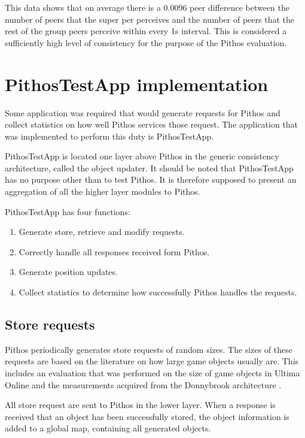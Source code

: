 This data shows that on average there is a 0.0096 peer difference between the number of peers that the super per perceives and the number of peers that the rest of the group peers perceive within every 1s interval. This is considered a sufficiently high level of consistency for the purpose of the Pithos evaluation.

\section{PithosTestApp implementation}
\label{pithostestapp}

Some application was required that would generate requests for Pithos and collect statistics on how well Pithos services those request. The application that was implemented to perform this duty is PithosTestApp.

PithosTestApp is located one layer above Pithos in the generic consistency architecture, called the object updater. It should be noted that PithosTestApp has no purpose other than to test Pithos. It is therefore supposed to present an aggregation of all the higher layer modules to Pithos.

PithosTestApp has four functions:
\begin{enumerate}
\item Generate store, retrieve and modify requests.
\item Correctly handle all responses received form Pithos.
\item Generate position updates.
\item Collect statistics to determine how successfully Pithos handles the requests.
\end{enumerate}

\subsection{Store requests}

Pithos periodically generates store requests of random sizes. The sizes of these requests are based on the literature on how large game objects usually are. This includes an evaluation that was performed on the size of game objects in Ultima Online and the measurements acquired from the Donnybrook architecture \cite{Bharambe_Donnybrook}.

All store request are sent to Pithos in the lower layer. When a response is received that an object has been successfully stored, the object information is added to a global map, containing all generated objects.

